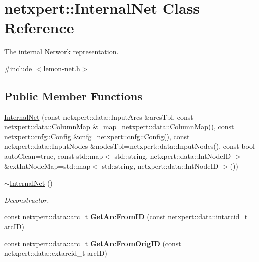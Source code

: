 \hypertarget{classnetxpert_1_1InternalNet}{}\section{netxpert\+:\+:Internal\+Net Class Reference}
\label{classnetxpert_1_1InternalNet}


The internal Network representation.  




{\ttfamily \#include $<$lemon-\/net.\+h$>$}

\subsection*{Public Member Functions}
\begin{DoxyCompactItemize}
\item 
\hyperlink{classnetxpert_1_1InternalNet_ade299cebc75fa88cc5a6df932ebbe896}{Internal\+Net} (const netxpert\+::data\+::\+Input\+Arcs \&arcs\+Tbl, const \hyperlink{structnetxpert_1_1data_1_1ColumnMap}{netxpert\+::data\+::\+Column\+Map} \&\+\_\+map=\hyperlink{structnetxpert_1_1data_1_1ColumnMap}{netxpert\+::data\+::\+Column\+Map}(), const \hyperlink{structnetxpert_1_1cnfg_1_1Config}{netxpert\+::cnfg\+::\+Config} \&cnfg=\hyperlink{structnetxpert_1_1cnfg_1_1Config}{netxpert\+::cnfg\+::\+Config}(), const netxpert\+::data\+::\+Input\+Nodes \&nodes\+Tbl=netxpert\+::data\+::\+Input\+Nodes(), const bool auto\+Clean=true, const std\+::map$<$ std\+::string, netxpert\+::data\+::\+Int\+Node\+ID $>$ \&ext\+Int\+Node\+Map=std\+::map$<$ std\+::string, netxpert\+::data\+::\+Int\+Node\+ID $>$())
\item 
\hyperlink{classnetxpert_1_1InternalNet_a2f4b653540c70d6be7d5b7097b78bc2c}{$\sim$\+Internal\+Net} ()\hypertarget{classnetxpert_1_1InternalNet_a2f4b653540c70d6be7d5b7097b78bc2c}{}\label{classnetxpert_1_1InternalNet_a2f4b653540c70d6be7d5b7097b78bc2c}

\begin{DoxyCompactList}\small\item\em Deconstructor. \end{DoxyCompactList}\item 
const netxpert\+::data\+::arc\+\_\+t {\bfseries Get\+Arc\+From\+ID} (const netxpert\+::data\+::intarcid\+\_\+t arc\+ID)\hypertarget{classnetxpert_1_1InternalNet_a115ab61c1fbfc9302c8c1316f7edee88}{}\label{classnetxpert_1_1InternalNet_a115ab61c1fbfc9302c8c1316f7edee88}

\item 
const netxpert\+::data\+::arc\+\_\+t {\bfseries Get\+Arc\+From\+Orig\+ID} (const netxpert\+::data\+::extarcid\+\_\+t arc\+ID)\hypertarget{classnetxpert_1_1InternalNet_aa5ac2ea0cb99043a7794de05aa8dd73c}{}\label{classnetxpert_1_1InternalNet_aa5ac2ea0cb99043a7794de05aa8dd73c}


\end{DoxyCompactItemize}
